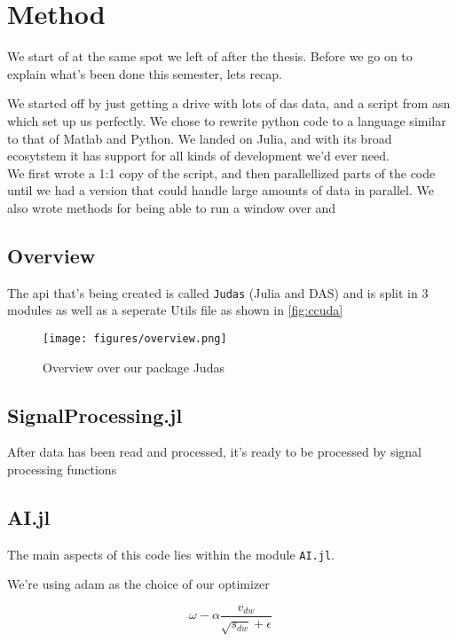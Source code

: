 \chapter{Method}
\label{chap:method}

We start of at the same spot we left of after the thesis. Before we go on to explain what's been done this semester, lets recap. 

We started off by just getting a drive with lots of \acrshort{das} data, and a script from \acrfull{asn} which set up us perfectly. We chose to rewrite python code to a language similar to that of Matlab and Python. We landed on Julia, and with its broad ecosytstem it has support for all kinds of development we'd ever need. \\

We first wrote a 1:1 copy of the script, and then parallellized parts of the code until we had a version that could handle large amounts of data in parallel. We also wrote methods for being able to run a window over and \\ 


\section{Overview}

The \acrshort{api} that's being created is called \texttt{Judas} (Julia and DAS) and is split in 3 modules as well as a seperate Utils file as shown in \ref{fig:ccuda}

\begin{figure}[h]
    \centering
    \texttt{[image: figures/overview.png]}
    \caption{Overview over our package Judas}
    \label{fig:judasoverview}
\end{figure}








\section{SignalProcessing.jl}

After data has been read and processed, it's ready to be processed by signal processing functions 

\section{AI.jl}

The main aspects of this code lies within the module \texttt{AI.jl}. 






We're using \acrfull{adam} as the choice of our optimizer

\begin{equation}
    \omega - \alpha \frac{v_{dw}}  {\sqrt{s_{dw}} + \epsilon}
\end{equation}